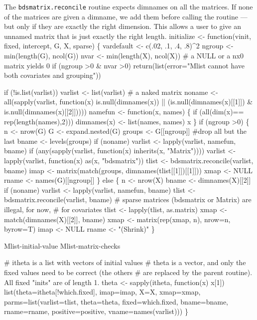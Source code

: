 \documentclass{article}
\begin{document}
The {\tt{}bdsmatrix.reconcile} routine expects dimnames on all the
matrices.  If none of the matrices are given a dimname, we add
them before calling the routine --- but only if they are exactly
the right dimension.  This allows a user to give an unnamed matrix
that is just exactly the right length.
\nwenddocs{}\endmoddef
initialize <- function(vinit, fixed, intercept, G, X, sparse) \{
    vardefault <- c(.02, .1, .4, .8)^2
    ngroup <- min(length(G), ncol(G))
    nvar   <- min(length(X), ncol(X))  # a NULL or a nx0 matrix yields 0
    if (ngroup >0 & nvar >0)
        return(list(error="Mlist cannot have both covariates and grouping"))

    if (!is.list(varlist)) varlist <- list(varlist)  # a naked matrix
    noname <- all(sapply(varlist, function(x) is.null(dimnames(x)) || 
                      (is.null(dimnames(x)[[1]]) & is.null(dimnames(x)[[2]]))))
    namefun <- function(x, names) \{
        if (all(dim(x)== rep(length(names),2))) 
            dimnames(x) <- list(names, names)
        x
        \}
    if (ngroup >0) \{
        n <- nrow(G)
        G <- expand.nested(G)
        groups <- G[[ngroup]]  #drop all but the last
        bname <- levels(groups)
        if (noname) varlist <- lapply(varlist, namefun, bname)
        if (any(sapply(varlist, function(x) inherits(x, "Matrix"))))
            varlist <- lapply(varlist, function(x) as(x, "bdsmatrix"))
        tlist <- bdsmatrix.reconcile(varlist, bname)
        imap <- matrix(match(groups, dimnames(tlist[[1]])[[1]]))
        xmap <- NULL
        rname <- names(G)[[ngroup]]
        \}
    else \{
        n <- nrow(X)
        bname <- dimnames(X)[[2]]
        if (noname) varlist <- lapply(varlist, namefun, bname)
        tlist <- bdsmatrix.reconcile(varlist, bname)
        # sparse matrices (bdsmatrix or Matrix) are illegal, for now, 
        #   for covariates
        tlist <- lapply(tlist, as.matrix)
        xmap <- match(dimnames(X)[[2]], bname)
        xmap <- matrix(rep(xmap, n), nrow=n, byrow=T)
        imap <- NULL
        rname <- "(Shrink)"
        \}

    \LA{}Mlist-initial-value\RA{}
    \LA{}Mlist-matrix-checks\RA{}

    # itheta is a list with vectors of initial values
    # theta is a vector, and only the fixed values need to be correct (the others
    #  are replaced by the parent routine).  All fixed "inits" are of length 1.
    theta <- sapply(itheta, function(x) x[1])    
    list(theta=itheta[!which.fixed], imap=imap, X=X, xmap=xmap,
         parms=list(varlist=tlist, theta=theta, fixed=which.fixed,
                    bname=bname, rname=rname, positive=positive,
                    vname=names(varlist)))
    \}
\nwendcode{}\nwdocspar
\end{document}
